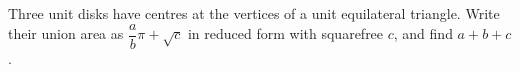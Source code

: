 Three unit disks have centres at the vertices of a unit equilateral triangle. Write their union area as $\dfrac{a}{b}\pi+\sqrt c$ in reduced form with squarefree $c$, and find $a+b+c$.
